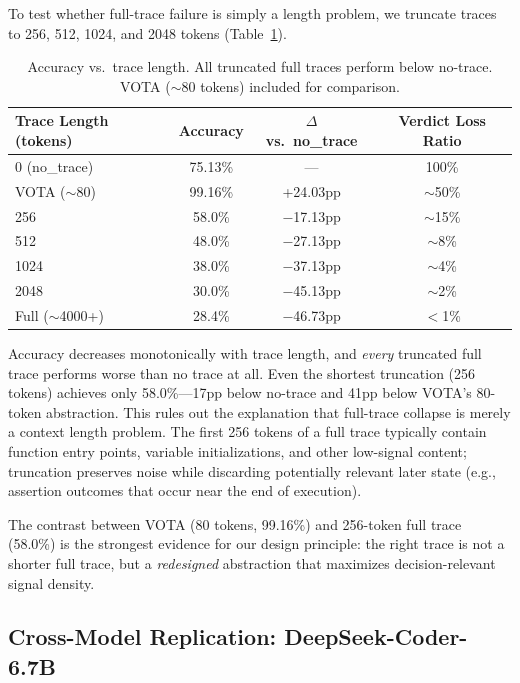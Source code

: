 \documentclass[11pt]{article}
\begin{document}
To test whether full-trace failure is simply a length problem, we truncate traces to 256, 512, 1024, and 2048 tokens (Table~\ref{tab:length}).

\begin{table}[h]
\centering
\caption{Accuracy vs.\ trace length. All truncated full traces perform below no-trace. VOTA ($\sim$80 tokens) included for comparison.}
\label{tab:length}
\begin{tabular}{lccc}
\toprule
\textbf{Trace Length (tokens)} & \textbf{Accuracy} & \textbf{$\Delta$ vs.\ no\_trace} & \textbf{Verdict Loss Ratio} \\
\midrule
0 (no\_trace)          & 75.13\% & ---        & 100\%   \\
VOTA ($\sim$80)        & 99.16\% & +24.03pp   & $\sim$50\% \\
256                    & 58.0\%  & $-$17.13pp & $\sim$15\% \\
512                    & 48.0\%  & $-$27.13pp & $\sim$8\%  \\
1024                   & 38.0\%  & $-$37.13pp & $\sim$4\%  \\
2048                   & 30.0\%  & $-$45.13pp & $\sim$2\%  \\
Full ($\sim$4000+)     & 28.4\%  & $-$46.73pp & $<$1\%  \\
\bottomrule
\end{tabular}
\end{table}

Accuracy decreases monotonically with trace length, and \emph{every} truncated full trace performs worse than no trace at all. Even the shortest truncation (256 tokens) achieves only 58.0\%---17pp below no-trace and 41pp below VOTA's 80-token abstraction. This rules out the explanation that full-trace collapse is merely a context length problem. The first 256 tokens of a full trace typically contain function entry points, variable initializations, and other low-signal content; truncation preserves noise while discarding potentially relevant later state (e.g., assertion outcomes that occur near the end of execution).

The contrast between VOTA (80 tokens, 99.16\%) and 256-token full trace (58.0\%) is the strongest evidence for our design principle: the right trace is not a shorter full trace, but a \emph{redesigned} abstraction that maximizes decision-relevant signal density.

\subsection{Cross-Model Replication: DeepSeek-Coder-6.7B}
\label{sec:deepseek}
\end{document}
